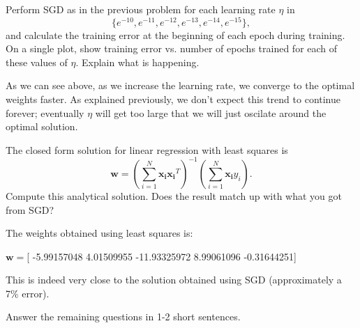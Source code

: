 \begin{problem}[2]
  Perform SGD as in the previous problem for each learning rate $\eta$ in \[\{e^{-10}, e^{-11}, e^{-12}, e^{-13}, e^{-14}, e^{-15}\},\] and calculate the training error at the beginning of each epoch during training.  On a single plot, show training error vs. number of epochs trained for each of these values of $\eta$. Explain what is happening.
\end{problem}
\begin{solution}
  \begin{figure}[H]
   \end{figure}
   As we can see above, as we increase the learning rate, we converge to the optimal weights faster. As explained previously, we don't expect this trend to continue forever; eventually $\eta$ will get too large that we will just oscilate around the optimal solution.
\end{solution}


\begin{problem}[2]
  The closed form solution for linear regression with least squares is \[\mathbf{w} = \left(\sum_{i=1}^N \mathbf{x_i}\mathbf{x_i}^T\right)^{-1}\left(\sum_{i=1}^N \mathbf{x_i}y_i\right).\]  Compute this analytical solution.  Does the result match up with what you got from SGD?
\end{problem}
\begin{solution}
 The weights obtained using least squares is:

 $\mathbf{w}=$[ -5.99157048   4.01509955 -11.93325972   8.99061096  -0.31644251]

 This is indeed very close to the solution obtained using SGD (approximately a 7\% error).
\end{solution}

Answer the remaining questions in 1-2 short sentences.

